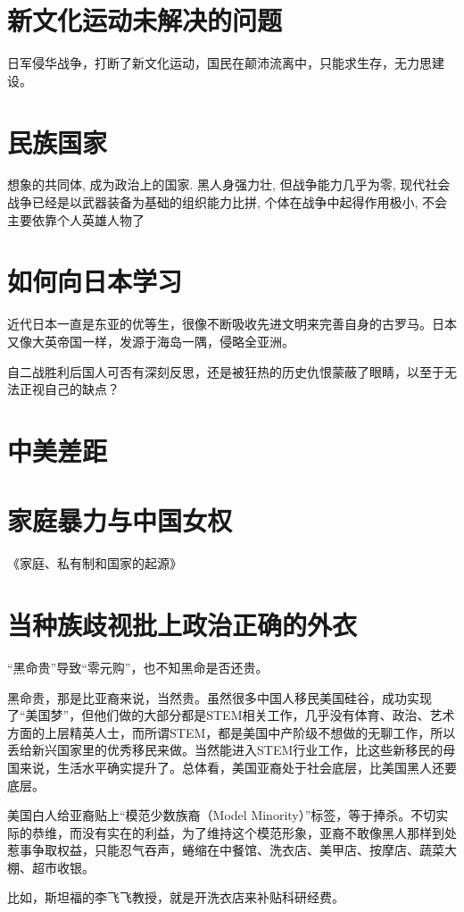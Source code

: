 \documentclass[fontset=founder]{ctexbook}
\begin{document}
\section{新文化运动未解决的问题}
日军侵华战争，打断了新文化运动，国民在颠沛流离中，只能求生存，无力思建设。

\section{民族国家}
想象的共同体, 成为政治上的国家.
黑人身强力壮, 但战争能力几乎为零, 现代社会战争已经是以武器装备为基础的组织能力比拼, 个体在战争中起得作用极小, 不会主要依靠个人英雄人物了
\section{如何向日本学习}
近代日本一直是东亚的优等生，很像不断吸收先进文明来完善自身的古罗马。日本又像大英帝国一样，发源于海岛一隅，侵略全亚洲。

自二战胜利后国人可否有深刻反思，还是被狂热的历史仇恨蒙蔽了眼睛，以至于无法正视自己的缺点？
\section{中美差距}

\section{家庭暴力与中国女权}
《家庭、私有制和国家的起源》

\section{当种族歧视批上政治正确的外衣}
“黑命贵”导致“零元购”，也不知黑命是否还贵。

黑命贵，那是比亚裔来说，当然贵。虽然很多中国人移民美国硅谷，成功实现了“美国梦”，但他们做的大部分都是STEM相关工作，几乎没有体育、政治、艺术方面的上层精英人士，而所谓STEM，都是美国中产阶级不想做的无聊工作，所以丢给新兴国家里的优秀移民来做。当然能进入STEM行业工作，比这些新移民的母国来说，生活水平确实提升了。总体看，美国亚裔处于社会底层，比美国黑人还要底层。

美国白人给亚裔贴上“模范少数族裔（Model Minority）”标签，等于捧杀。不切实际的恭维，而没有实在的利益，为了维持这个模范形象，亚裔不敢像黑人那样到处惹事争取权益，只能忍气吞声，蜷缩在中餐馆、洗衣店、美甲店、按摩店、蔬菜大棚、超市收银。

比如，斯坦福的李飞飞教授，就是开洗衣店来补贴科研经费。
\end{document}
